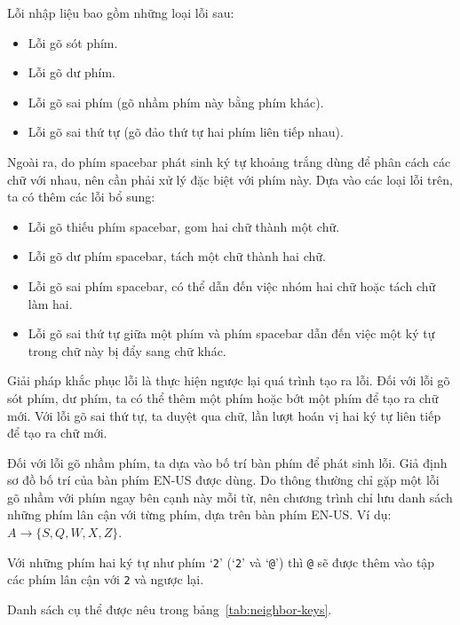 \documentclass[a4paper,oneside,14pt]{extbook} %
\begin{document}
Lỗi nhập liệu bao gồm những loại lỗi sau:
\begin{itemize}
\item Lỗi gõ sót phím.
\item Lỗi gõ dư phím.
\item Lỗi gõ sai phím (gõ nhầm phím này bằng phím khác).
\item Lỗi gõ sai thứ tự (gõ đảo thứ tự hai phím liên tiếp nhau).
\end{itemize}

Ngoài ra, do phím spacebar phát sinh ký tự khoảng trắng dùng để phân
cách các chữ với nhau, nên cần phải xử lý đặc biệt với phím này. Dựa
vào các loại lỗi trên, ta có thêm các lỗi bổ sung:
\begin{itemize}
\item Lỗi gõ thiếu phím spacebar, gom hai chữ thành một chữ.
\item Lỗi gõ dư phím spacebar, tách một chữ thành hai chữ.
\item Lỗi gõ sai phím spacebar, có thể dẫn đến việc nhóm hai chữ hoặc
  tách chữ làm hai.
\item Lỗi gõ sai thứ tự giữa một phím và phím spacebar dẫn đến việc
  một ký tự trong chữ này bị đẩy sang chữ khác.
\end{itemize}

Giải pháp khắc phục lỗi là thực hiện ngược lại quá trình tạo ra
lỗi. Đối với lỗi gõ sót phím, dư phím, ta có thể thêm một phím hoặc
bớt một phím để tạo ra chữ mới. Với lỗi gõ sai thứ tự, ta duyệt qua
chữ, lần lượt hoán vị hai ký tự liên tiếp để tạo ra chữ mới.

Đối với lỗi gõ nhầm phím, ta dựa vào bố trí bàn phím để phát sinh
lỗi. Giả định sơ đồ bố trí của bàn phím EN-US được dùng. Do thông
thường chỉ gặp một lỗi gõ nhầm với phím ngay bên cạnh này mỗi 
từ, nên chương trình chỉ lưu danh  sách những phím lân cận với từng
phím, dựa trên bàn phím EN-US. Ví dụ: $A \rightarrow \{ S, Q, W, X, Z \}$. 

Với những phím hai ký tự như phím `\texttt{2}' (`\texttt{2}' và
`\texttt{@}') thì \texttt{@} sẽ được thêm 
vào tập các phím lân cận với \texttt{2} và ngược lại.

Danh sách cụ thể được nêu trong bảng~\ref{tab:neighbor-keys}.
\end{document}
